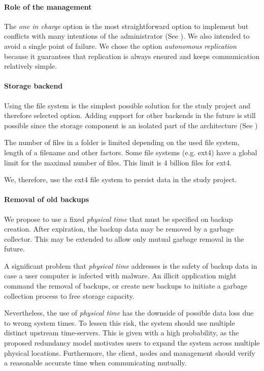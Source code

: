 \paragraph{Role of the management}
The \emph{one in charge} option is the most straightforward option to implement but conflicts with many intentions of the administrator (See ). We also intended to avoid a single point of failure. We chose the option \emph{autonomous replication} because it guarantees that replication is always ensured and keeps communication relatively simple.

\paragraph{Storage backend}
Using the file system is the simplest possible solution for the study project and therefore selected option. Adding support for other backends in the future is still possible since the storage component is an isolated part of the architecture (See )

The number of files in a folder is limited depending on the used file system, length of a filename and other factors. Some file systems (e.g. ext4) have a global limit for the maximal number of files. This limit is 4 billion files for ext4. \cite{ext4}

We, therefore, use the ext4 file system to persist data in the study project.

\paragraph{Removal of old backups}\label{sec:removal-of-old-backups}
We propose to use a fixed \emph{physical time} that must be specified on backup creation. After expiration, the backup data may be removed by a garbage collector. This may be extended to allow only mutual garbage removal in the future.

A significant problem that \emph{physical time} addresses is the safety of backup data in case a user computer is infected with malware. An illicit application might command the removal of backups, or create new backups to initiate a garbage collection process to free storage capacity.

Nevertheless, the use of \emph{physical time} has the downside of possible data loss due to wrong system times. To lessen this risk, the system should use multiple distinct upstream time-servers. This is given with a high probability, as the proposed redundancy model motivates users to expand the system across multiple physical locations. Furthermore, the client, nodes and management should verify a reasonable accurate time when communicating mutually.


